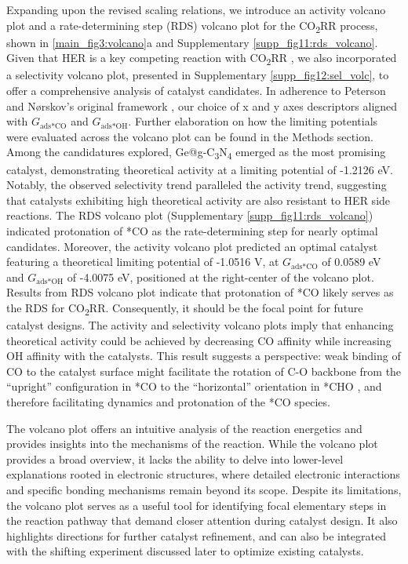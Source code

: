 \documentclass[a4paper, 12pt, titlepage]{article}
\begin{document}
Expanding upon the revised scaling relations, we introduce an activity volcano plot and a rate-determining step (RDS) volcano plot for the CO\textsubscript{2}RR process, shown in \cref{main_fig3:volcano}a and Supplementary \cref{supp_fig11:rds_volcano}.
Given that HER is a key competing reaction with CO\textsubscript{2}RR \cite{goyal2020competition}, we also incorporated a selectivity volcano plot, presented in Supplementary \cref{supp_fig12:sel_volc}, to offer a comprehensive analysis of catalyst candidates.
In adherence to Peterson and Nørskov's original framework \cite{peterson2012activity}, our choice of x and y axes descriptors aligned with $\textit{G}_{\text{ads} \ast \text{CO}}$ and $\textit{G}_{\text{ads} \ast \text{OH}}$.
Further elaboration on how the limiting potentials were evaluated across the volcano plot can be found in the Methods section.
Among the candidatures explored, Ge@g-C\textsubscript{3}N\textsubscript{4} emerged as the most promising catalyst, demonstrating theoretical activity at a limiting potential of -1.2126 eV.
Notably, the observed selectivity trend paralleled the activity trend, suggesting that catalysts exhibiting high theoretical activity are also resistant to HER side reactions.
The RDS volcano plot (Supplementary \cref{supp_fig11:rds_volcano}) indicated protonation of *CO as the rate-determining step for nearly optimal candidates.
Moreover, the activity volcano plot predicted an optimal catalyst featuring a theoretical limiting potential of -1.0516 V, at $\textit{G}_{\text{ads} \ast \text{CO}}$ of 0.0589 eV and $\textit{G}_{\text{ads} \ast \text{OH}}$ of -4.0075 eV, positioned at the right-center of the volcano plot.
Results from RDS volcano plot indicate that protonation of *CO likely serves as the RDS for CO\textsubscript{2}RR.
Consequently, it should be the focal point for future catalyst designs.
The activity and selectivity volcano plots imply that enhancing theoretical activity could be achieved by decreasing CO affinity while increasing OH affinity with the catalysts.
This result suggests a perspective: weak binding of CO to the catalyst surface might facilitate the rotation of C-O backbone from the ``upright'' configuration in *CO to the ``horizontal'' orientation in *CHO \cite{peterson2010copper},
and therefore facilitating dynamics and protonation of the *CO species.

The volcano plot offers an intuitive analysis of the reaction energetics and provides insights into the mechanisms of the reaction.
While the volcano plot provides a broad overview, it lacks the ability to delve into lower-level explanations rooted in electronic structures, where detailed electronic interactions and specific bonding mechanisms remain beyond its scope.
Despite its limitations, the volcano plot serves as a useful tool for identifying focal elementary steps in the reaction pathway that demand closer attention during catalyst design.
It also highlights directions for further catalyst refinement, and can also be integrated with the shifting experiment discussed later to optimize existing catalysts.
\end{document}
